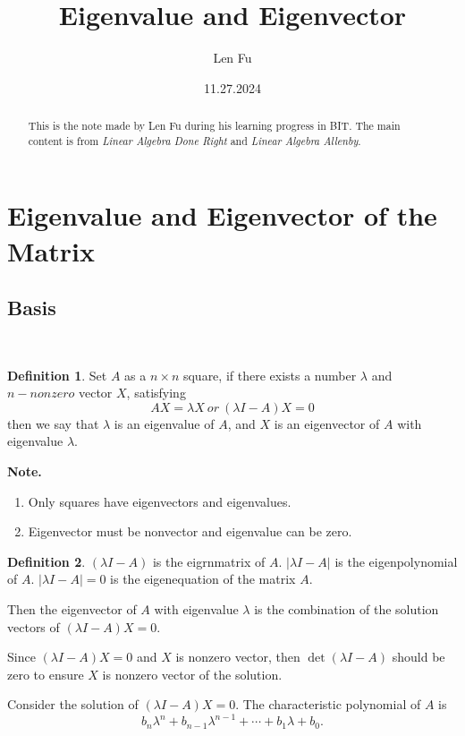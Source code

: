 \documentclass{article}
\title{Eigenvalue and Eigenvector}
\author{Len Fu}
\date{11.27.2024}
\theoremstyle{definition}
\newtheorem{defi}{Definition}[section]
\begin{document}
\maketitle

\begin{abstract}
    This is the note made by Len Fu during his learning progress in BIT.
    The main content is from \textit{Linear Algebra Done Right} and \textit{Linear Algebra Allenby}.
\end{abstract}

\tableofcontents

\newpage

\section{Eigenvalue and Eigenvector of the Matrix}
\subsection{Basis}\
\begin{defi}
    Set $A$ as a $n\times n$ square, if there exists a 
    number $\lambda$ and $n-nonzero$ vector $X$, satisfying 
    $$AX=\lambda X\ or\ (\lambda I-A)X=0$$
    then we say that $\lambda$ is an eigenvalue of $A$, and
    $X$ is an eigenvector of $A$ with eigenvalue $\lambda$.
\end{defi}

\textbf{Note.}
\begin{enumerate}
    \item Only squares have eigenvectors and eigenvalues.
    \item Eigenvector must be nonvector and eigenvalue can be zero.
\end{enumerate}


\begin{defi}
    $(\lambda I-A)$ is the eigrnmatrix of $A$. $|\lambda I-A|$ is the eigenpolynomial of $A$.
    $|\lambda I-A|=0$ is the eigenequation of the matrix $A$.
\end{defi}

Then the eigenvector of $A$ with eigenvalue $\lambda$ is the combination of the solution vectors of $(\lambda I-A)X=0$.

Since $(\lambda I-A)X=0$ and $X$ is nonzero vector, then 
$\det (\lambda I-A)$ should be zero to ensure $X$ is nonzero vector of the solution.

Consider the solution of $(\lambda I-A)X=0$.
The characteristic polynomial of $A$ is 
$$b_{n}\lambda^{n}+b_{n-1}\lambda^{n-1}+\cdots+b_{1}\lambda+b_{0}.$$
\end{document}
